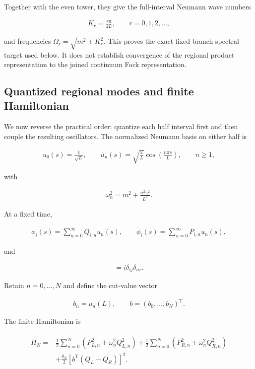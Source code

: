 Together with the even tower, they give the full-interval Neumann wave numbers

\begin{align}
K_r=\frac{r\pi}{2L},
\qquad
r=0,1,2,\ldots,
\end{align}

and frequencies $\Omega_r=\sqrt{m^2+K_r^2}$. This proves the exact fixed-branch spectral target used below. It does not establish convergence of the regional product representation to the joined continuum Fock representation.

\subsection{Quantized regional modes and finite Hamiltonian}\label{subsec:interval-finite-hamiltonian}

We now reverse the practical order: quantize each half interval first and then couple the resulting oscillators. The normalized Neumann basis on either half is

\begin{align}
u_0(s)=\frac1{\sqrt L},
\qquad
u_n(s)=\sqrt{\frac2L}\cos\left(\frac{n\pi s}{L}\right),
\qquad n\geq1,
\end{align}

with

\begin{align}
\omega_n^2=m^2+\frac{n^2\pi^2}{L^2}.
\end{align}

At a fixed time,

\begin{align}
\phi_i(s)=\sum_{n=0}^{\infty}Q_{i,n}u_n(s),
\qquad
\dot{\phi}_i(s)=\sum_{n=0}^{\infty}P_{i,n}u_n(s),
\end{align}

and

\begin{align}
[Q_{i,n},P_{j,r}]=i\delta_{ij}\delta_{nr}.
\end{align}

Retain $n=0,\ldots,N$ and define the cut-value vector

\begin{align}
b_n=u_n(L),
\qquad
b=\left(b_0,\ldots,b_N\right)^{\mathrm T}.
\end{align}

The finite Hamiltonian is

\begin{align}
\begin{aligned}
H_N={}&\frac12\sum_{n=0}^N
\left(P_{L,n}^2+\omega_n^2Q_{L,n}^2\right)
+\frac12\sum_{n=0}^N
\left(P_{R,n}^2+\omega_n^2Q_{R,n}^2\right)\\
&+\frac{g_N}{2}
\left[b^{\mathrm T}(Q_L-Q_R)\right]^2.
\end{aligned}
\end{align}

